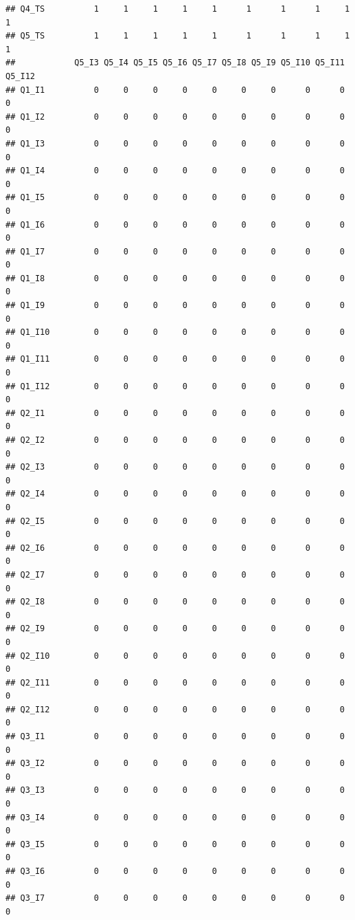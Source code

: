 \documentclass[]{book}
\begin{document}
\begin{verbatim}
## Q4_TS          1     1     1     1     1      1      1      1     1     1
## Q5_TS          1     1     1     1     1      1      1      1     1     1
##            Q5_I3 Q5_I4 Q5_I5 Q5_I6 Q5_I7 Q5_I8 Q5_I9 Q5_I10 Q5_I11 Q5_I12
## Q1_I1          0     0     0     0     0     0     0      0      0      0
## Q1_I2          0     0     0     0     0     0     0      0      0      0
## Q1_I3          0     0     0     0     0     0     0      0      0      0
## Q1_I4          0     0     0     0     0     0     0      0      0      0
## Q1_I5          0     0     0     0     0     0     0      0      0      0
## Q1_I6          0     0     0     0     0     0     0      0      0      0
## Q1_I7          0     0     0     0     0     0     0      0      0      0
## Q1_I8          0     0     0     0     0     0     0      0      0      0
## Q1_I9          0     0     0     0     0     0     0      0      0      0
## Q1_I10         0     0     0     0     0     0     0      0      0      0
## Q1_I11         0     0     0     0     0     0     0      0      0      0
## Q1_I12         0     0     0     0     0     0     0      0      0      0
## Q2_I1          0     0     0     0     0     0     0      0      0      0
## Q2_I2          0     0     0     0     0     0     0      0      0      0
## Q2_I3          0     0     0     0     0     0     0      0      0      0
## Q2_I4          0     0     0     0     0     0     0      0      0      0
## Q2_I5          0     0     0     0     0     0     0      0      0      0
## Q2_I6          0     0     0     0     0     0     0      0      0      0
## Q2_I7          0     0     0     0     0     0     0      0      0      0
## Q2_I8          0     0     0     0     0     0     0      0      0      0
## Q2_I9          0     0     0     0     0     0     0      0      0      0
## Q2_I10         0     0     0     0     0     0     0      0      0      0
## Q2_I11         0     0     0     0     0     0     0      0      0      0
## Q2_I12         0     0     0     0     0     0     0      0      0      0
## Q3_I1          0     0     0     0     0     0     0      0      0      0
## Q3_I2          0     0     0     0     0     0     0      0      0      0
## Q3_I3          0     0     0     0     0     0     0      0      0      0
## Q3_I4          0     0     0     0     0     0     0      0      0      0
## Q3_I5          0     0     0     0     0     0     0      0      0      0
## Q3_I6          0     0     0     0     0     0     0      0      0      0
## Q3_I7          0     0     0     0     0     0     0      0      0      0

\end{verbatim}
\end{document}
